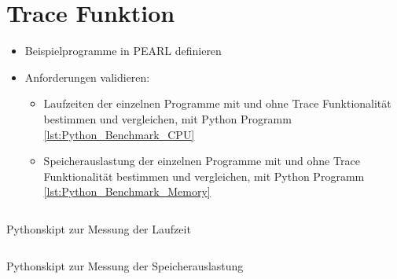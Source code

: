 \section{Trace Funktion}\label{Validierung:Trace Funktion}
\begin{itemize}
  \item Beispielprogramme in PEARL definieren
  \item Anforderungen validieren:
  \begin{itemize}
    \item Laufzeiten der einzelnen Programme mit und ohne Trace Funktionalität
    bestimmen und vergleichen, mit Python Programm
    \cref{lst:Python_Benchmark_CPU}
    \item Speicherauslastung der einzelnen Programme mit und ohne Trace
    Funktionalität bestimmen und vergleichen, mit Python Programm
    \cref{lst:Python_Benchmark_Memory}
  \end{itemize}
\end{itemize}

\begin{listing}[ht]
  \inputminted[frame=lines,linenos]{python}{./Python/benchmark_cpu.py}
  \caption{Pythonskipt zur Messung der Laufzeit}
  \label{lst:Python_Benchmark_CPU}   
\end{listing} 

\begin{listing}[ht]
  \inputminted[frame=lines,linenos]{python}{./Python/benchmark_memory.py}
  \caption{Pythonskipt zur Messung der Speicherauslastung}
  \label{lst:Python_Benchmark_Memory}   
\end{listing} 

